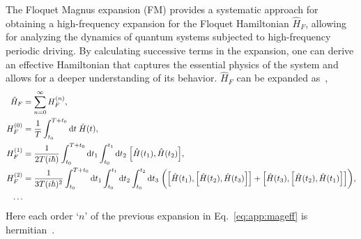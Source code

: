 \documentclass[%
nofootinbib,
reprint,
superscriptaddress,
amsmath,amssymb,showkeys,
aps,
prb,
]{revtex4-2}
\begin{document}
	The Floquet Magnus expansion (FM) provides a systematic approach for obtaining a high-frequency expansion for the Floquet Hamiltonian $\hat{H}_F$, allowing for analyzing the dynamics of quantum systems subjected to high-frequency periodic driving. By calculating successive terms in the expansion, one can derive an effective Hamiltonian that captures the essential physics of the system and allows for a deeper understanding of its behavior. $\hat{H}_F$ can be expanded as~\cite{haldar_dynamical_2017},	
	\begin{align}
		\hat{H}_F &= \sum_{n=0}^{\infty} H_F^{(n)},\nonumber\\
		H_F^{(0)} &= \frac{1}{T} \int_{t_0}^{T+t_0} \mathrm{d}t\;\hat{H}(t), \nonumber\\
		H_F^{(1)} &= \frac{1}{2T (i \hbar)} \int_{t_0}^{T+t_0} \mathrm{d}t_1  \int_{t_0}^{t_1} \mathrm{d}t_2\; \comm{\hat{H}(t_1)} {\hat{H}(t_2)},\nonumber\\
		H_F^{(2)} &= \frac{1}{3 T(i\hbar)^2} \int_{t_0}^{T+t_0} \mathrm{d}t_1  \int_{t_0}^{t_1} \mathrm{d}t_2 \int_{t_0}^{t_2} \mathrm{d}t_3\;\bigg(\comm{\hat{H}(t_1)}{\comm{\hat{H}(t_2)}{\hat{H}(t_3)}} + \comm{\hat{H}(t_3)}{\comm{\hat{H}(t_2)}{\hat{H}(t_1)}}\bigg), \\
		\dots & \nonumber
		\label{eq:app:mageff}
	\end{align} 
	Here each order `$n$' of the previous expansion in Eq.~\ref{eq:app:mageff} is hermitian~\cite{blanes_magnus_2009, haldar_statistical_2022}.
	
\end{document}
